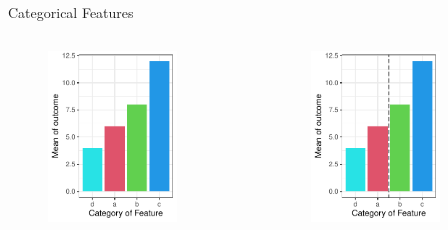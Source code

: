 \documentclass[11pt,compress,t,notes=noshow, xcolor=table]{beamer}
\begin{document}
\begin{vbframe}{Categorical Features}
\begin{columns}
\begin{column}{0.33\textwidth}
\begin{figure}
  \includegraphics[width=0.8\textwidth]{figure/categoryplot-cont2.pdf}
  \end{figure}
  \end{column}
  \begin{column}{0.33\textwidth}
  \begin{figure}
  \includegraphics[width=0.8\textwidth]{figure/categoryplot-cont3.pdf}
  \end{figure}
  \end{column}
  \end{columns}


\end{vbframe}
\end{document}
